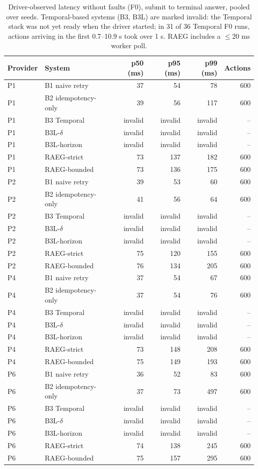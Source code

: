 \begin{table}[t]
\centering
\scriptsize
\caption{Driver-observed latency without faults (F0), submit to terminal answer, pooled over seeds. Temporal-based systems (B3, B3L) are marked invalid: the Temporal stack was not yet ready when the driver started; in 31 of 36 Temporal F0 runs, actions arriving in the first 0.7--10.9 s took over 1 s. RAEG includes a $\leq$20 ms worker poll.}
\label{tab:m7-latency}
\begin{tabular}{llrrrr}
\toprule
Provider & System & p50 (ms) & p95 (ms) & p99 (ms) & Actions \\
\midrule
P1 & B1 naive retry & 37 & 54 & 78 & 600 \\
P1 & B2 idempotency-only & 39 & 56 & 117 & 600 \\
P1 & B3 Temporal & invalid & invalid & invalid & -- \\
P1 & B3L-$\delta$ & invalid & invalid & invalid & -- \\
P1 & B3L-horizon & invalid & invalid & invalid & -- \\
P1 & RAEG-strict & 73 & 137 & 182 & 600 \\
P1 & RAEG-bounded & 73 & 136 & 175 & 600 \\
P2 & B1 naive retry & 39 & 53 & 60 & 600 \\
P2 & B2 idempotency-only & 41 & 56 & 64 & 600 \\
P2 & B3 Temporal & invalid & invalid & invalid & -- \\
P2 & B3L-$\delta$ & invalid & invalid & invalid & -- \\
P2 & B3L-horizon & invalid & invalid & invalid & -- \\
P2 & RAEG-strict & 75 & 120 & 155 & 600 \\
P2 & RAEG-bounded & 76 & 134 & 205 & 600 \\
P4 & B1 naive retry & 37 & 54 & 67 & 600 \\
P4 & B2 idempotency-only & 37 & 54 & 76 & 600 \\
P4 & B3 Temporal & invalid & invalid & invalid & -- \\
P4 & B3L-$\delta$ & invalid & invalid & invalid & -- \\
P4 & B3L-horizon & invalid & invalid & invalid & -- \\
P4 & RAEG-strict & 73 & 148 & 208 & 600 \\
P4 & RAEG-bounded & 75 & 149 & 193 & 600 \\
P6 & B1 naive retry & 36 & 52 & 83 & 600 \\
P6 & B2 idempotency-only & 37 & 73 & 497 & 600 \\
P6 & B3 Temporal & invalid & invalid & invalid & -- \\
P6 & B3L-$\delta$ & invalid & invalid & invalid & -- \\
P6 & B3L-horizon & invalid & invalid & invalid & -- \\
P6 & RAEG-strict & 74 & 138 & 245 & 600 \\
P6 & RAEG-bounded & 75 & 157 & 295 & 600 \\
\bottomrule
\end{tabular}
\end{table}
